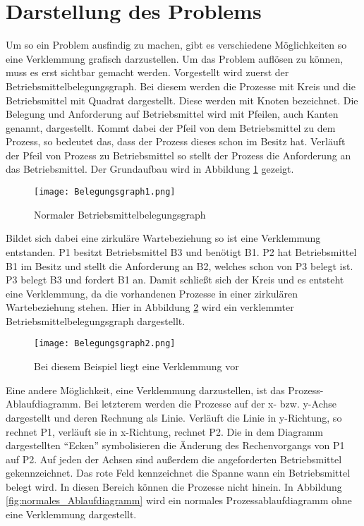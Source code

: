 \section{Darstellung des Problems}
\label{problem}
Um so ein Problem ausfindig zu machen, gibt es verschiedene Möglichkeiten so eine Verklemmung grafisch darzustellen. Um das Problem auflösen zu können, muss es erst sichtbar gemacht werden. Vorgestellt wird zuerst der Betriebsmittelbelegungsgraph. Bei diesem werden die Prozesse mit Kreis und die Betriebsmittel mit Quadrat dargestellt. Diese werden mit Knoten bezeichnet. Die Belegung und Anforderung auf Betriebsmittel wird mit Pfeilen, auch Kanten genannt, dargestellt. Kommt dabei der Pfeil von dem Betriebsmittel zu dem Prozess, so bedeutet das, dass der Prozess dieses schon im Besitz hat. Verläuft der Pfeil von Prozess zu Betriebsmittel so stellt der Prozess die Anforderung an das Betriebsmittel. Der Grundaufbau wird in Abbildung \ref{fig:normaler_betriebsmittelbelegungsgraph} gezeigt.

\begin{figure}[h]
\caption{Normaler Betriebsmittelbelegungsgraph}
\label{fig:normaler_betriebsmittelbelegungsgraph}
\centering
\texttt{[image: Belegungsgraph1.png]}
\end{figure}

Bildet sich dabei eine zirkuläre Wartebeziehung so ist eine Verklemmung entstanden. 
P1 besitzt Betriebsmittel B3 und benötigt B1. P2 hat Betriebsmittel B1 im Besitz und stellt die Anforderung an B2, welches schon von P3 belegt ist. P3 belegt B3 und fordert B1 an. Damit schließt sich der Kreis und es entsteht eine Verklemmung, da die vorhandenen Prozesse in einer zirkulären Wartebeziehung stehen. Hier in Abbildung \ref{fig:verklemmter_betriebsmittelbelegungsgraph} wird ein verklemmter Betriebsmittelbelegungsgraph dargestellt.

\begin{figure}[H]
\caption{Bei diesem Beispiel liegt eine Verklemmung vor}
\label{fig:verklemmter_betriebsmittelbelegungsgraph}
\centering
\texttt{[image: Belegungsgraph2.png]}
\end{figure}

Eine andere Möglichkeit, eine Verklemmung darzustellen, ist das Prozess-Ablaufdiagramm. Bei letzterem werden die Prozesse auf der x- bzw. y-Achse dargestellt und deren Rechnung als Linie. Verläuft die Linie in y-Richtung, so rechnet P1, verläuft sie in x-Richtung, rechnet P2. Die in dem Diagramm dargestellten ``Ecken'' symbolisieren die Änderung des Rechenvorgangs von P1 auf P2. Auf jeden der Achsen sind außerdem die angeforderten Betriebsmittel gekennzeichnet. Das rote Feld kennzeichnet die Spanne wann ein Betriebsmittel belegt wird. In diesen Bereich können die Prozesse nicht hinein.
In Abbildung \ref{fig:normales_Ablaufdiagramm} wird ein normales Prozessablaufdiagramm ohne eine Verklemmung dargestellt.

